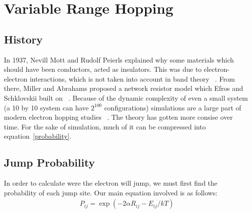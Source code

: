 \chapter{Variable Range Hopping}		%
\label{theorychap}

\section{History}
In 1937, Nevill Mott and Rudolf Peierls explained why some materials which should have been conductors, acted as insulators. This was due to electron-electron interactions, which is not taken into account in band theory ~\cite{mott72}. From there, Miller and Abrahams proposed a network resistor model which Efros and Schklovskii built on ~\cite{efros75}. Because of the dynamic complexity of even a small system (a 10 by 10 system can have $2^{100}$ configurations) simulations are a large part of modern electron hopping studies ~\cite{kirkengen09}. The theory has gotten more consise over time. For the sake of simulation, much of it can be compressed into equation~\ref{probability}.

\section{Jump Probability}

In order to calculate were the electron will jump, we must first find the probability of each jump site. Our main equation involved is as follows:
\begin{eqnarray}
P_{ij} = \exp (-2\alpha R_{ij} -  E_{ij}/kT)
\label{probability}
\end{eqnarray}

